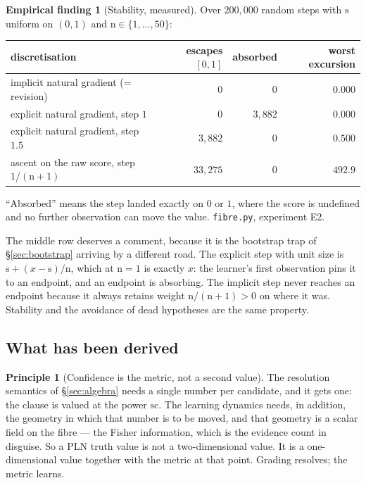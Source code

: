 \documentclass[11pt,a4paper]{article}
\theoremstyle{plain}
\theoremstyle{definition}
\newtheorem{principle}[theorem]{Principle}
\newtheorem{finding}[theorem]{Empirical finding}
\theoremstyle{remark}
\newcommand{\str}{\mathrm{s}}
\newcommand{\conf}{\mathrm{c}}
\newcommand{\ev}{\mathrm{n}}
\begin{document}
\begin{finding}[Stability, measured]\label{find:stable}
Over $200{,}000$ random steps with $\str$ uniform on $(0,1)$ and
$\ev \in \{1,\dots,50\}$:

\medskip
\begin{center}
\small
\begin{tabular}{lrrr}
\toprule
discretisation & escapes $[0,1]$ & absorbed & worst excursion \\
\midrule
implicit natural gradient (= revision) & $0$ & $0$ & $0.000$ \\
explicit natural gradient, step $1$ & $0$ & $3{,}882$ & $0.000$ \\
explicit natural gradient, step $1.5$ & $3{,}882$ & $0$ & $0.500$ \\
ascent on the raw score, step $1/(\ev+1)$ & $33{,}275$ & $0$ & $492.9$ \\
\bottomrule
\end{tabular}
\end{center}
\medskip

\noindent``Absorbed'' means the step landed exactly on $0$ or $1$, where the
score is undefined and no further observation can move the value.
\texttt{fibre.py}, experiment E2.
\end{finding}

The middle row deserves a comment, because it is the bootstrap trap of
\S\ref{sec:bootstrap} arriving by a different road. The explicit step with unit
size is $\str + (x-\str)/\ev$, which at $\ev = 1$ is exactly $x$: the learner's
first observation pins it to an endpoint, and an endpoint is absorbing. The
implicit step never reaches an endpoint because it always retains weight
$\ev/(\ev+1) > 0$ on where it was. Stability and the avoidance of dead
hypotheses are the same property.

\subsection{What has been derived}

\begin{principle}[Confidence is the metric, not a second value]
\label{prin:metric}
The resolution semantics of \S\ref{sec:algebra} needs a single number per
candidate, and it gets one: the clause is valued at the power $\str\conf$. The
learning dynamics needs, in addition, the geometry in which that number is to be
moved, and that geometry is a scalar field on the fibre --- the Fisher
information, which is the evidence count in disguise. So a PLN truth value is not
a two-dimensional value. It is a one-dimensional value together with the metric
at that point. Grading resolves; the metric learns.
\end{principle}
\end{document}
